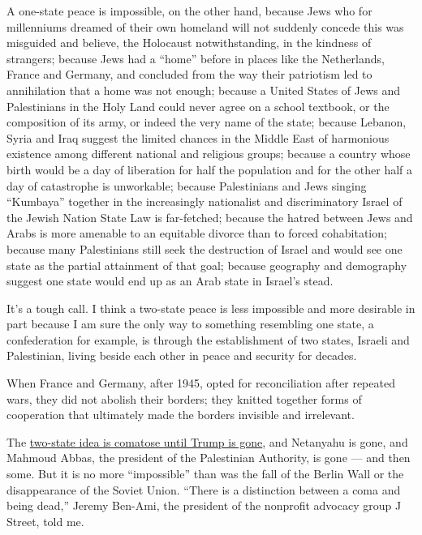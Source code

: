 A one-state peace is impossible, on the other hand, because Jews who for
millenniums dreamed of their own homeland will not suddenly concede this
was misguided and believe, the Holocaust notwithstanding, in the
kindness of strangers; because Jews had a ``home'' before in places like
the Netherlands, France and Germany, and concluded from the way their
patriotism led to annihilation that a home was not enough; because a
United States of Jews and Palestinians in the Holy Land could never
agree on a school textbook, or the composition of its army, or indeed
the very name of the state; because Lebanon, Syria and Iraq suggest the
limited chances in the Middle East of harmonious existence among
different national and religious groups; because a country whose birth
would be a day of liberation for half the population and for the other
half a day of catastrophe is unworkable; because Palestinians and Jews
singing ``Kumbaya'' together in the increasingly nationalist and
discriminatory Israel of the Jewish Nation State Law is far-fetched;
because the hatred between Jews and Arabs is more amenable to an
equitable divorce than to forced cohabitation; because many Palestinians
still seek the destruction of Israel and would see one state as the
partial attainment of that goal; because geography and demography
suggest one state would end up as an Arab state in Israel's stead.

It's a tough call. I think a two-state peace is less impossible and more
desirable in part because I am sure the only way to something resembling
one state, a confederation for example, is through the establishment of
two states, Israeli and Palestinian, living beside each other in peace
and security for decades.

When France and Germany, after 1945, opted for reconciliation after
repeated wars, they did not abolish their borders; they knitted together
forms of cooperation that ultimately made the borders invisible and
irrelevant.

The
\href{https://www.nytimes3xbfgragh.onion/2017/12/07/us/politics/trump-jerusalem-palestinians.html}{two-state
idea is comatose until Trump is gone}, and Netanyahu is gone, and
Mahmoud Abbas, the president of the Palestinian Authority, is gone ---
and then some. But it is no more ``impossible'' than was the fall of the
Berlin Wall or the disappearance of the Soviet Union. ``There is a
distinction between a coma and being dead,'' Jeremy Ben-Ami, the
president of the nonprofit advocacy group J Street, told me.

